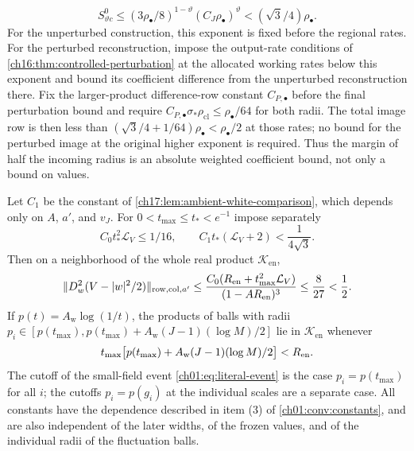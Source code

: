 \begin{lemma}
\[
 S_{\vartheta c}^0\le(3\rho_\bullet/8)^{1-\vartheta}(C_J\rho_\bullet)^\vartheta<(\sqrt3/4)\rho_\bullet.
\]
For the unperturbed construction, this exponent is fixed before the regional rates. For the perturbed reconstruction, impose the output-rate conditions of \cref{ch16:thm:controlled-perturbation} at the allocated working rates below this exponent and bound its coefficient difference from the unperturbed reconstruction there. Fix the larger-product difference-row constant $C_{P,\bullet}$ before the final perturbation bound and require $C_{P,\bullet}\sigma_*\rho_{\mathrm{cl}}\le\rho_\bullet/64$ for both radii. The total image row is then less than $(\sqrt3/4+1/64)\rho_\bullet<\rho_\bullet/2$ at those rates; no bound for the perturbed image at the original higher exponent is required. Thus the margin of half the incoming radius is an absolute weighted coefficient bound, not only a bound on values.

Let $C_1$ be the constant of \cref{ch17:lem:ambient-white-comparison}, which depends only on $A$, $a'$, and $v_J$. For $0<t_{\max}\le t_*<e^{-1}$ impose separately
\begin{equation}\label{ch17:eq:coupling-budgets}
 C_0t_*^2\mathcal L_V\le1/16,\qquad C_1t_*(\mathcal L_V+2)<\frac1{4\sqrt3}.
\end{equation}
Then on a neighborhood of the whole real product $\mathcal K_{\mathrm{en}}$,
\begin{equation}\label{ch17:eq:curvature}
 \lVert D_w^2(V-\lvert w\rvert^2/2)\rVert_{\mathrm{row,col},a'}\le\frac{C_0(R_{\mathrm{en}}+t_{\max}^2\mathcal L_V)}{(1-AR_{\mathrm{en}})^3}\le\frac8{27}<\frac12.
\end{equation}
If $p(t)=A_{\mathrm w}\log(1/t)$, the products of balls with radii $p_i\in[p(t_{\max}),p(t_{\max})+A_{\mathrm w}(J-1)(\log M)/2]$ lie in $\mathcal K_{\mathrm{en}}$ whenever
\[
 t_{\max}\bigl[p(t_{\max})+A_{\mathrm w}(J-1)(\log M)/2\bigr]<R_{\mathrm{en}}.
\]
The cutoff of the small-field event \eqref{ch01:eq:literal-event} is the case $p_i=p(t_{\max})$ for all $i$; the cutoffs $p_i=p(g_i)$ at the individual scales are a separate case. All constants have the dependence described in item (3) of \cref{ch01:conv:constants}, and are also independent of the later widths, of the frozen values, and of the individual radii of the fluctuation balls.
\end{lemma}

